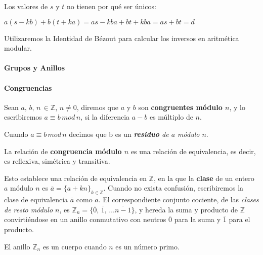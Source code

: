 \begin{remark}
	Los valores de $s$ y $t$ no tienen por qué ser únicos:
	
	${\displaystyle a(s-kb)+b(t+ka)=as-kba+bt+kba=as+bt = d}$
\end{remark}

\hfil

Utilizaremos la Identidad de Bézout para calcular los inversos en aritmética modular.

\hfil

\paragraph{Grupos y Anillos}


\paragraph{Congruencias}

\begin{definition}
	Sean $a,\,b,\,n\,\in \mathbb{Z}$, $n \neq 0$, diremos que $a$ y $b$ son \textbf{congruentes módulo $n$}, y lo escribiremos $a \equiv b \, mod \, n$, si la diferencia $a - b$ es múltiplo de $n$.
\end{definition}

Cuando $a \equiv b \, mod \, n$ decimos que b es un \textit{\textbf{residuo} de $a$ módulo $n$}.

\begin{proposition}
	La relación de \textbf{congruencia módulo $n$} es una relación de equivalencia, es decir, es reflexiva, simétrica y transitiva.
\end{proposition}

Esto establece una relación de equivalencia en $\mathbb{Z}$, en la que la \textbf{clase} de un entero $a$ módulo $n$ es $\overline{a} = \{ a + kn \}_{k \in \mathbb{Z}}$. Cuando no exista confusión, escribiremos la clase de equivalencia $\overline{a}$ como $a$.
El correspondiente conjunto cociente, de las \textit{clases de resto módulo $n$}, es $\mathbb{Z}_n = \{\overline{0},\,\overline{1},\,\dots\overline{n-1}\}$, y hereda la suma y producto de $\mathbb{Z}$ convirtiéndose en un anillo conmutativo con neutros $\overline{0}$ para la suma y $\overline{1}$ para el producto.


\begin{theorem}
	El anillo $\mathbb{Z}_n$ es un cuerpo cuando $n$ es un número primo.
\end{theorem}


